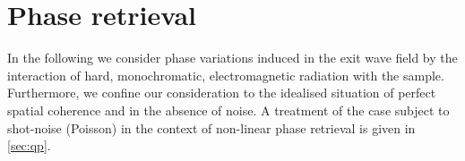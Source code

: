 \documentclass[
twoside,
openright,
titlepage,
numbers=noenddot,
headinclude,
fleqn,
a4paper,
footinclude=true,
cleardoublepage=empty,
abstractoff,
BCOR=5mm,
paper=a4,
fontsize=11pt,
british,ngerman,american,
]{scrreprt}
\begin{document}


\section{Phase retrieval}
\label{sec:phase-retrieval}




In the following we consider phase variations induced in the exit wave
field by the interaction of hard, monochromatic, electromagnetic
radiation with the sample.  Furthermore, we confine our consideration
to the idealised situation of perfect spatial coherence and in the
absence of noise.  A treatment of the case subject to shot-noise
(Poisson) in the context of non-linear phase retrieval is given in
\cref{sec:qp}.
\end{document}
